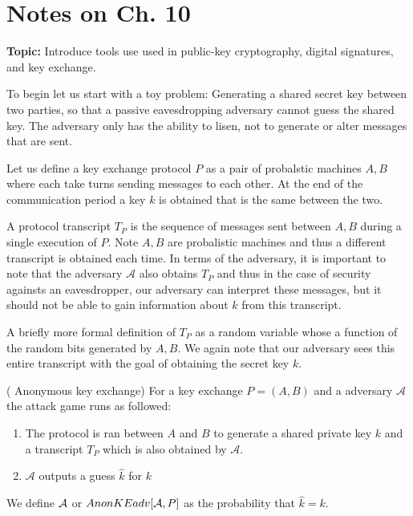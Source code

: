 \chapter{Notes on Ch. 10}

\textbf{Topic:} Introduce tools use used in public-key cryptography, digital signatures, and key exchange.\\
\vspace{1em}

To begin let us start with a toy problem: Generating a 
shared secret key between two parties, so that a passive eavesdropping adversary cannot guess the shared key. The adversary only has the ability to lisen, not to generate or alter messages that are sent. 

Let us define a key exchange protocol \(P\) as a pair of probalstic machines \(A,B\)  where each take turns sending messages to each other. At the end of the communication period a key \(k\)  is obtained that is the same between the two. 

A protocol transcript \(T_P\) is the sequence of messages sent between \(A,B\) during a single execution of \(P\). Note \(A,B\) are probalistic machines and thus a different transcript is obtained each time. In terms of the adversary, it is important to note that the adversary \(\mathcal{A}\) also obtains \(T_P\) and thus in the case of security againsts an eavesdropper, our adversary can interpret these messages, but it should not be able to gain information about \(k\) from this transcript. 

A briefly more formal definition of \(T_P\) as a random variable whose a function of the random bits generated by \(A,B\). We again note that our adversary sees this entire transcript with the goal of obtaining the secret key \(k\). 

\begin{attackGame}( Anonymous key exchange)
For a key exchange \(P=(A,B)\) and a adversary \(\mathcal{A}\) the attack game runs as followed:
\begin{enumerate}
    \item The protocol is ran between \(A\) and \(B\) to generate a shared private key \(k\) and a transcript \(T_P\) which is also obtained by \(\mathcal{A}\). 
    \item \(\mathcal{A}\) outputs a guess \(\hat{k}\) for \(k\)       
\end{enumerate}

We define \(\mathcal{A}\) or \(AnonKEadv[\mathcal{A}, P]\) as the probability that \(\hat{k} = k\). 
\end{attackGame}

